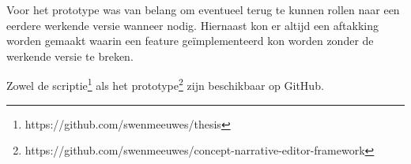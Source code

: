 Voor het prototype was van belang om eventueel terug te kunnen rollen naar een eerdere werkende versie wanneer nodig. Hiernaast kon er altijd een aftakking worden gemaakt waarin een feature geïmplementeerd kon worden zonder de werkende versie te breken.

Zowel de scriptie\footnote{https://github.com/swenmeeuwes/thesis} als het prototype\footnote{https://github.com/swenmeeuwes/concept-narrative-editor-framework} zijn beschikbaar op GitHub.
